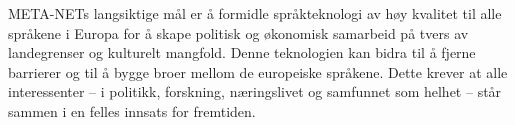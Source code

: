 \begin{multicols}{2}


META-NETs langsiktige mål er å formidle språkteknologi av høy kvalitet til alle språkene i Europa for å skape politisk og økonomisk samarbeid på tvers av landegrenser og kulturelt mangfold. Denne teknologien kan bidra til å fjerne barrierer og til å bygge broer mellom de europeiske språkene. Dette krever at alle interessenter – i politikk, forskning, næringslivet og samfunnet som helhet – står sammen i en felles innsats for fremtiden.

\end{multicols}

\clearpage

